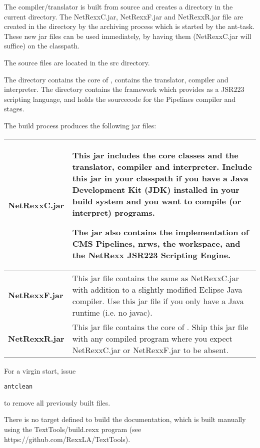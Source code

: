 The compiler/translator is built from source and creates a 
directory in the current directory. The NetRexxC.jar, NetRexxF.jar and NetRexxR.jar file are created
in the  directory by the archiving process which is started by the 
ant-task. These new jar files can be used immediately, by having them (NetRexxC.jar will suffice) on the classpath.

The \nr{} source files are located in the src directory.

The  directory contains the core of \nr{},  contains
the translator, compiler and interpreter. The  directory contains the framework which
provides \nr{} as a JSR223 scripting language, and  holds the sourcecode for the
\nr{} Pipelines compiler and stages.

The  build process produces the following jar files:

\begin{tabularx}{\textwidth}{>{\bfseries}lX}
\toprule
NetRexxC.jar & This jar includes the core \nr{} classes and the \nr{} translator, compiler and interpreter.
Include this jar in your classpath if you have a Java Development Kit (JDK) installed in your build system and you
want to compile (or interpret) \nr{} programs.

The jar also contains the \nr{} implementation of CMS Pipelines, nrws, the \nr{} workspace, and the
NetRexx JSR223 Scripting Engine.
\\\midrule
NetRexxF.jar & This jar file contains the same as NetRexxC.jar with addition to a slightly modified Eclipse
Java compiler. Use this jar file if you only have a Java runtime (i.e. no javac).
\\\midrule
NetRexxR.jar & This jar file contains the core of \nr{}. Ship this jar file with any compiled \nr{} program where
you expect NetRexxC.jar or NetRexxF.jar to be absent.
\\\bottomrule
\end{tabularx}

For a virgin start, issue
\begin{alltt}
    ant clean
\end{alltt}
to remove all previously built files.

There is no target defined to build the documentation, which is built manually using the TextTools/build.rexx
program (see https://github.com/RexxLA/TextTools).

